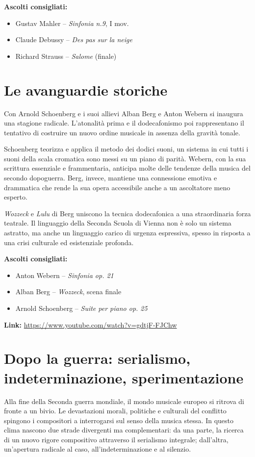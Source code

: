 \documentclass[12pt,a4paper]{article}
\begin{document}
\textbf{Ascolti consigliati:}
\begin{itemize}
  \item Gustav Mahler -- \textit{Sinfonia n.9}, I mov.
  \item Claude Debussy -- \textit{Des pas sur la neige}
  \item Richard Strauss -- \textit{Salome} (finale)
\end{itemize}

\section{Le avanguardie storiche}
Con Arnold Schoenberg e i suoi allievi Alban Berg e Anton Webern si inaugura una stagione radicale. L’atonalit\`a prima e il dodecafonismo poi rappresentano il tentativo di costruire un nuovo ordine musicale in assenza della gravit\`a tonale.

Schoenberg teorizza e applica il metodo dei dodici suoni, un sistema in cui tutti i suoni della scala cromatica sono messi su un piano di parit\`a. Webern, con la sua scrittura essenziale e frammentaria, anticipa molte delle tendenze della musica del secondo dopoguerra. Berg, invece, mantiene una connessione emotiva e drammatica che rende la sua opera accessibile anche a un ascoltatore meno esperto.

\emph{Wozzeck} e \emph{Lulu} di Berg uniscono la tecnica dodecafonica a una straordinaria forza teatrale. Il linguaggio della Seconda Scuola di Vienna non \`e solo un sistema astratto, ma anche un linguaggio carico di urgenza espressiva, spesso in risposta a una crisi culturale ed esistenziale profonda.

\textbf{Ascolti consigliati:}
\begin{itemize}
  \item Anton Webern -- \textit{Sinfonia op. 21}
  \item Alban Berg -- \textit{Wozzeck}, scena finale
  \item Arnold Schoenberg -- \textit{Suite per piano op. 25}
\end{itemize}
\textbf{Link:} \url{https://www.youtube.com/watch?v=gdtjF-FJChw}

\section{Dopo la guerra: serialismo, indeterminazione, sperimentazione}
Alla fine della Seconda guerra mondiale, il mondo musicale europeo si ritrova di fronte a un bivio. Le devastazioni morali, politiche e culturali del conflitto spingono i compositori a interrogarsi sul senso della musica stessa. In questo clima nascono due strade divergenti ma complementari: da una parte, la ricerca di un nuovo rigore compositivo attraverso il serialismo integrale; dall’altra, un’apertura radicale al caso, all’indeterminazione e al silenzio.
\end{document}
